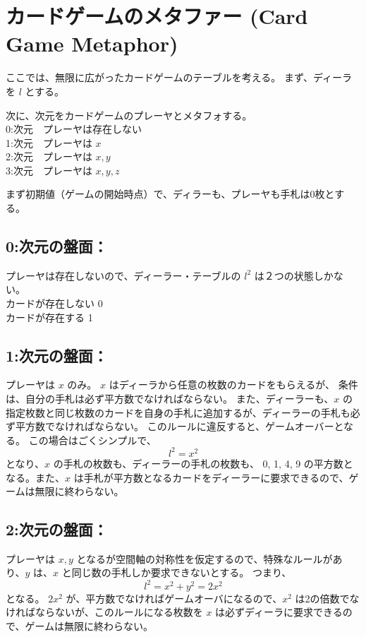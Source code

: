 \documentclass[a4paper,11pt]{ltjsarticle}
\begin{document}
\section{カードゲームのメタファー (Card Game Metaphor)}
ここでは、無限に広がったカードゲームのテーブルを考える。
まず、ディーラを \( l \) とする。

次に、次元をカードゲームのプレーヤとメタフォする。\\
0:次元　プレーヤは存在しない\\
1:次元　プレーヤは \( x \)\\
2:次元　プレーヤは \( x, y \)\\
3:次元　プレーヤは \( x, y, z \)

まず初期値（ゲームの開始時点）で、ディラーも、プレーヤも手札は0枚とする。

\subsection*{0:次元の盤面：}
プレーヤは存在しないので、ディーラー・テーブルの \( l^2 \) は２つの状態しかない。\\
カードが存在しない 0\\
カードが存在する  1

\subsection*{1:次元の盤面：}
プレーヤは \( x \) のみ。
\( x \) はディーラから任意の枚数のカードをもらえるが、
条件は、自分の手札は必ず平方数でなければならない。
また、ディーラーも、\( x \) の指定枚数と同じ枚数のカードを自身の手札に追加するが、ディーラーの手札も必ず平方数でなければならない。
このルールに違反すると、ゲームオーバーとなる。
この場合はごくシンプルで、
\[ l^2 = x^2 \]
となり、\( x \) の手札の枚数も、ディーラーの手札の枚数も、
0, 1, 4, 9 の平方数となる。また、\( x \) は手札が平方数となるカードをディーラーに要求できるので、ゲームは無限に終わらない。

\subsection*{2:次元の盤面：}
プレーヤは \( x, y \) となるが空間軸の対称性を仮定するので、特殊なルールがあり、\( y \) は、\( x \) と同じ数の手札しか要求できないとする。
つまり、
\[ l^2 = x^2 + y^2 = 2x^2 \]
となる。
\( 2x^2 \) が、平方数でなければゲームオーバになるので、\( x^2 \) は2の倍数でなければならないが、このルールになる枚数を \( x \) は必ずディーラに要求できるので、ゲームは無限に終わらない。
\end{document}
